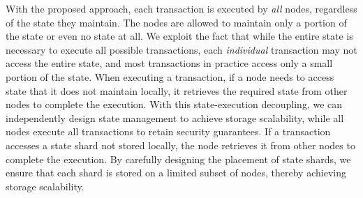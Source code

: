 With the proposed approach, each transaction is executed by \emph{all} nodes, regardless of the state they maintain.
The nodes are allowed to maintain only a portion of the state or even no state at all.
We exploit the fact that while the entire state is necessary to execute all possible transactions, each \emph{individual} transaction may not access the entire state, and most transactions in practice access only a small portion of the state.
When executing a transaction, if a node needs to access state that it does not maintain locally, it retrieves the required state from other nodes to complete the execution.
With this state-execution decoupling, we can independently design state management to achieve storage scalability, while all nodes execute all transactions to retain security guarantees.
If a transaction accesses a state shard not stored locally, the node retrieves it from other nodes to complete the execution.
By carefully designing the placement of state shards, we ensure that each shard is stored on a limited subset of nodes, thereby achieving storage scalability.



\fi
